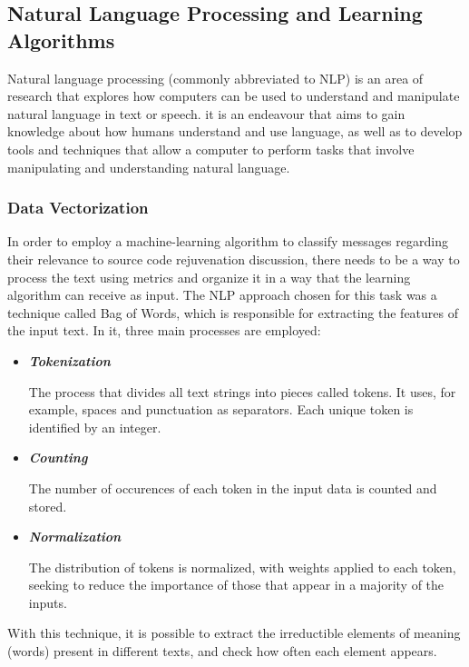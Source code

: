 \subsection{Natural Language Processing and Learning Algorithms}
Natural language processing (commonly abbreviated to NLP) is an area of research that explores how computers can be used to understand and manipulate natural language in text or speech. it is an endeavour that aims to gain knowledge about how humans understand and use language, as well as to develop tools and techniques that allow a computer to perform tasks that involve manipulating and understanding natural language. \cite{chowdhary2020natural}

\subsubsection{Data Vectorization}

In order to employ a machine-learning algorithm to classify messages regarding their relevance to source code rejuvenation discussion, there needs to be a way to process the text using metrics and organize it in a way that the learning algorithm can receive as input. The NLP approach chosen for this task was a technique called Bag of Words, which is responsible for extracting the features of the input text. In it, three main processes are employed:

    \begin{itemize}
    \item{\textbf{\textit{Tokenization}}}
    
    The process that divides all text strings into pieces called tokens. It uses, for example, spaces and punctuation as separators. Each unique token is identified by an integer.
    
    \item{\textbf{\textit{Counting}}}
    
    The number of occurences of each token in the input data is counted and stored.
    
    \item{\textbf{\textit{Normalization}}}
    
    The distribution of tokens is normalized, with weights applied to each token, seeking to reduce the importance of those that appear in a majority of the inputs.
    
    \end{itemize}

With this technique, it is possible to extract the irreductible elements of meaning (words) present in different texts, and check how often each element appears.

